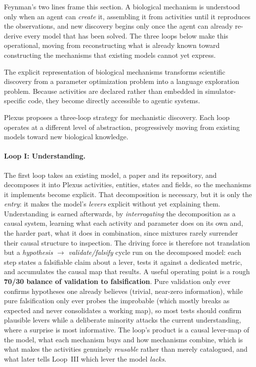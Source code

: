 \documentclass[11pt]{article}
\begin{document}
Feynman's two lines frame this section. A biological mechanism is understood only when
an agent can \emph{create} it, assembling it from activities until it reproduces the
observations, and new discovery begins only once the agent can already re-derive every
model that has been solved. The three loops below make this operational, moving from
reconstructing what is already known toward constructing the mechanisms that existing
models cannot yet express.

The explicit representation of biological mechanisms transforms scientific discovery
from a parameter optimization problem into a language exploration problem. Because
activities are declared rather than embedded in simulator-specific code, they become
directly accessible to agentic systems.

Plexus proposes a three-loop strategy for mechanistic discovery. Each loop operates at
a different level of abstraction, progressively moving from existing models toward new
biological knowledge.

\paragraph{Loop I: Understanding.}

The first loop takes an existing model, a paper and its repository, and decomposes it
into Plexus activities, entities, states and fields, so the mechanisms it implements
become explicit. That decomposition is necessary, but it is only the \emph{entry}: it
makes the model's \emph{levers} explicit without yet explaining them. Understanding is
earned afterwards, by \emph{interrogating} the decomposition as a causal system,
learning what each activity and parameter does on its own and, the harder part, what it
does in combination, since mixtures rarely surrender their causal structure to
inspection. The driving force is therefore not translation but a \emph{hypothesis
$\to$ validate/falsify} cycle run on the decomposed model: each step states a
falsifiable claim about a lever, tests it against a dedicated metric, and accumulates
the causal map that results. A useful operating point is a rough \textbf{70/30 balance
of validation to falsification}. Pure validation only ever confirms hypotheses one
already believes (trivial, near-zero information), while pure falsification only ever
probes the improbable (which mostly breaks as expected and never consolidates a working
map), so most tests should confirm plausible levers while a deliberate minority attacks
the current understanding, where a surprise is most informative. The loop's product is
a causal lever-map of the model, what each mechanism buys and how mechanisms combine,
which is what makes the activities genuinely \emph{reusable} rather than merely
catalogued, and what later tells Loop~III which lever the model \emph{lacks}.
\end{document}
